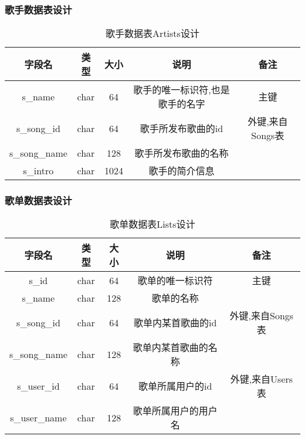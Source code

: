 \subsubsection{歌手数据表设计}
\begin{table}[htbp]
	\centering
	\caption{歌手数据表Artists设计} \label{tab:artists-database}
	\begin{tabular}{|c|c|c|c|c|}
		\hline
		字段名 & 类型 & 大小 & 说明 & 备注 \\
		\hline
		s\_name & char & 64 & 歌手的唯一标识符,也是歌手的名字 & 主键 \\
		\hline
		s\_song\_id & char & 64 & 歌手所发布歌曲的id & 外键,来自Songs表 \\
		\hline
		s\_song\_name & char & 128 & 歌手所发布歌曲的名称 & \\
		\hline
		s\_intro & char & 1024 & 歌手的简介信息 & \\
		\hline
	\end{tabular}
\end{table}

\subsubsection{歌单数据表设计}
\begin{table}[htbp]
	\centering
	\caption{歌单数据表Lists设计} \label{tab:lists-database}
	\begin{tabular}{|c|c|c|c|c|}
		\hline
		字段名 & 类型 & 大小 & 说明 & 备注 \\
		\hline
		s\_id & char & 64 & 歌单的唯一标识符 & 主键 \\
		\hline
		s\_name & char & 128 & 歌单的名称 & \\
		\hline
		s\_song\_id & char & 64 & 歌单内某首歌曲的id & 外键,来自Songs表 \\
		\hline
		s\_song\_name & char & 128 & 歌单内某首歌曲的名称 & \\
		\hline
		s\_user\_id & char & 64 & 歌单所属用户的id & 外键,来自Users表\\
		\hline
		s\_user\_name & char & 128 & 歌单所属用户的用户名 & \\
		\hline
	\end{tabular}
\end{table}

